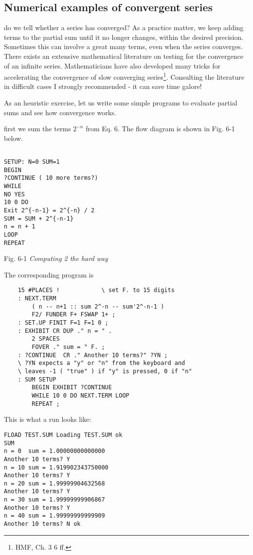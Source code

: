 \subsection{Numerical examples of convergent series}
 do we tell whether a series has converged? As a practice matter, we keep adding terms to the partial sum until it no longer changes, within the desired precision. Sometimes this can involve a great many terms, even when the series converges. There exists an extensive mathematical literature on testing for the convergence of an infinite series. Mathematicians have also developed many tricks for accelerating the convergence of slow converging series\footnote{HMF, Ch. 3 6 ff.}. Consulting the literature in difficult cases I strongly recommended - it can save time galore!

As an heuristic exercise, let us write some simple programs to evaluate partial sums and see how convergence works.

first we sum the terms $2^{-n}$ from Eq. 6. The flow diagram is shown in Fig. 6-1 below.

\begin{lstlisting}

SETUP: N=0 SUM=1
BEGIN
?CONTINUE ( 10 more terms?)
WHILE
NO YES
10 0 DO
Exit 2^{-n-1} = 2^{-n} / 2
SUM = SUM + 2^{-n-1}
n = n + 1
LOOP
REPEAT
\end{lstlisting}

Fig. 6-1 \textit{Computing 2 the hard way}

The corresponding program is

\begin{lstlisting}
    15 #PLACES !            \ set F. to 15 digits
    : NEXT.TERM
        ( n -- n+1 :: sum 2^-n -- sum'2^-n-1 )
        F2/ FUNDER F+ FSWAP 1+ ;
    : SET.UP FINIT F=1 F=1 0 ;
    : EXHIBIT CR DUP ." n = " .
        2 SPACES
        FOVER ." sum = " F. ;
    : ?CONTINUE  CR ." Another 10 terms?" ?YN ;
    \ ?YN expects a "y" or "n" from the keyboard and
    \ leaves -1 ( "true" ) if "y" is pressed, 0 if "n"
    : SUM SETUP
        BEGIN EXHIBIT ?CONTINUE
        WHILE 10 0 DO NEXT.TERM LOOP
        REPEAT ;
\end{lstlisting}

This is what a run looks like:

\begin{lstlisting}
FLOAD TEST.SUM Loading TEST.SUM ok
SUM
n = 0  sum = 1.00000000000000
Another 10 terms? Y
n = 10 sum = 1.919902343750000
Another 10 terms? Y
n = 20 sum = 1.99999904632568
Another 10 terms? Y
n = 30 sum = 1.99999999906867
Another 10 terms? Y
n = 40 sum = 1.99999999999909
Another 10 terms? N ok
\end{lstlisting}

